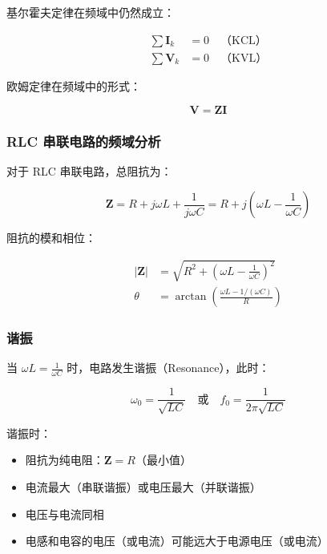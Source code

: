 基尔霍夫定律在频域中仍然成立：

\begin{align}
\sum \mathbf{I}_k &= 0 \quad \text{（KCL）} \label{eq:kcl-phasor} \\
\sum \mathbf{V}_k &= 0 \quad \text{（KVL）} \label{eq:kvl-phasor}
\end{align}

欧姆定律在频域中的形式：

\begin{equation}
\mathbf{V} = \mathbf{Z} \mathbf{I} \label{eq:ohm-law-phasor}
\end{equation}

\subsubsection{RLC 串联电路的频域分析}

对于 RLC 串联电路，总阻抗为：

\begin{equation}
\mathbf{Z} = R + j\omega L + \frac{1}{j\omega C} = R + j\left(\omega L - \frac{1}{\omega C}\right) \label{eq:rlc-series-impedance}
\end{equation}

阻抗的模和相位：

\begin{align}
|\mathbf{Z}| &= \sqrt{R^2 + \left(\omega L - \frac{1}{\omega C}\right)^2} \label{eq:rlc-impedance-magnitude} \\
\theta &= \arctan\left(\frac{\omega L - 1/(\omega C)}{R}\right) \label{eq:rlc-impedance-phase}
\end{align}

\subsubsection{谐振}

当 $\omega L = \frac{1}{\omega C}$ 时，电路发生谐振（Resonance），此时：

\begin{equation}
\omega_0 = \frac{1}{\sqrt{LC}} \quad \text{或} \quad f_0 = \frac{1}{2\pi\sqrt{LC}} \label{eq:resonant-frequency}
\end{equation}

谐振时：
\begin{itemize}
  \item 阻抗为纯电阻：$\mathbf{Z} = R$（最小值）
  \item 电流最大（串联谐振）或电压最大（并联谐振）
  \item 电压与电流同相
  \item 电感和电容的电压（或电流）可能远大于电源电压（或电流）
\end{itemize}

